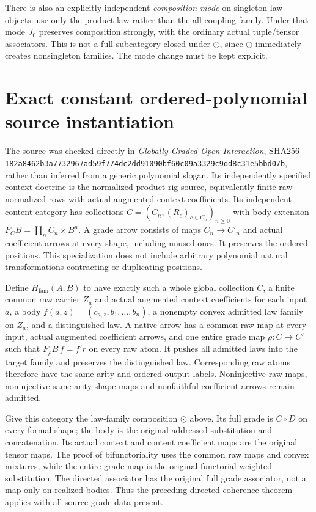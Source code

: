 \documentclass[11pt]{article}
\begin{document}
There is also an explicitly independent \emph{composition mode} on singleton-law objects: use only the product law rather than the all-coupling family. Under that mode $J_0$ preserves composition strongly, with the ordinary actual tuple/tensor associators. This is not a full subcategory closed under $\odot$, since $\odot$ immediately creates nonsingleton families. The mode change must be kept explicit.

\section{Exact constant ordered-polynomial source instantiation}
The source was checked directly in \emph{Globally Graded Open Interaction}, SHA256 \texttt{182a8462b3a7732967ad59f774dc2dd91090bf60c09a3329c9dd8c31e5bbd07b}, rather than inferred from a generic polynomial slogan. Its independently specified context doctrine is the normalized product-rig source, equivalently finite raw normalized rows with actual augmented context coefficients. Its independent content category has collections $C=(C_n,(R_c)_{c\in C_n})_{n\geq0}$ with body extension $F_CB=\coprod_n C_n\times B^n$. A grade arrow consists of maps $C_n\to C'_n$ and actual coefficient arrows at every shape, including unused ones. It preserves the ordered positions. This specialization does not include arbitrary polynomial natural transformations contracting or duplicating positions.

Define $H_{\mathrm{fam}}(A,B)$ to have exactly such a whole global collection $C$, a finite common raw carrier $Z_a$ and actual augmented context coefficients for each input $a$, a body $f(a,z)=(c_{a,z},b_1,\ldots,b_n)$, a nonempty convex admitted law family on $Z_a$, and a distinguished law. A native arrow has a common raw map at every input, actual augmented coefficient arrows, and one entire grade map $\rho:C\to C'$ such that $F_\rho B\,f=f' r$ on every raw atom. It pushes all admitted laws into the target family and preserves the distinguished law. Corresponding raw atoms therefore have the same arity and ordered output labels. Noninjective raw maps, noninjective same-arity shape maps and nonfaithful coefficient arrows remain admitted.

Give this category the law-family composition $\odot$ above. Its full grade is $C\circ D$ on every formal shape; the body is the original addressed substitution and concatenation. Its actual context and content coefficient maps are the original tensor maps. The proof of bifunctoriality uses the common raw maps and convex mixtures, while the entire grade map is the original functorial weighted substitution. The directed associator has the original full grade associator, not a map only on realized bodies. Thus the preceding directed coherence theorem applies with all source-grade data present.
\end{document}
